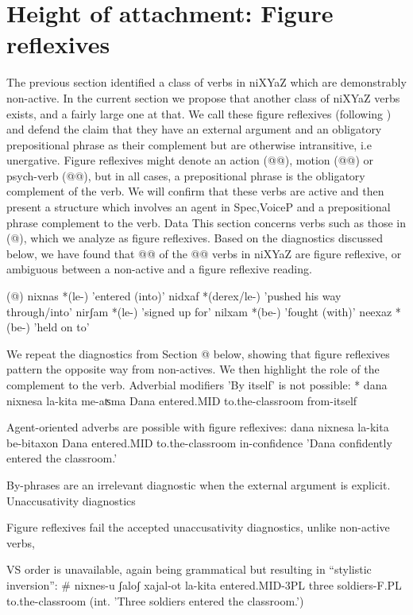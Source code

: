 \section{Height of attachment: Figure reflexives}
The previous section identified a class of verbs in niXYaZ which are demonstrably non-active. In the current section we propose that another class of niXYaZ verbs exists, and a fairly large one at that. We call these figure reflexives (following \cite{woord14nllt}) and defend the claim that they have an external argument and an obligatory prepositional phrase as their complement but are otherwise intransitive, i.e unergative. Figure reflexives might denote an action (@@), motion (@@) or psych-verb (@@), but in all cases, a prepositional phrase is the obligatory complement of the verb. We will confirm that these verbs are active and then present a structure which involves an agent in Spec,VoiceP and a prepositional phrase complement to the verb.
Data
This section concerns verbs such as those in (@), which we analyze as figure reflexives. Based on the diagnostics discussed below, we have found that @@ of the @@ verbs in niXYaZ are figure reflexive, or ambiguous between a non-active and a figure reflexive reading.
   
(@)     nixnas  *(le-)  'entered (into)' 
        nidxaf  *(derex/le-)  'pushed his way through/into' 
        nirʃam  *(le-)  'signed up for' 
        nilxam  *(be-)  'fought (with)' 
        neexaz  *(be-)  'held on to' 
    
We repeat the diagnostics from Section @ below, showing that figure reflexives pattern the opposite way from non-actives. We then highlight the role of the complement to the verb.
Adverbial modifiers
'By itself' is not possible:
     * dana nixnesa la-kita me-aʦma
         Dana entered.MID to.the-classroom from-itself

Agent-oriented adverbs are possible with figure reflexives:
         dana nixnesa la-kita be-bitaxon
         Dana entered.MID to.the-classroom in-confidence
         'Dana confidently entered the classroom.'

By-phrases are an irrelevant diagnostic when the external argument is explicit.
Unaccusativity diagnostics

Figure reflexives fail the accepted unaccusativity diagnostics, unlike non-active verbs,

VS order is unavailable, again being grammatical but resulting in “stylistic inversion”:
 \# nixnes-u ʃaloʃ xajal-ot la-kita
         entered.MID-3PL three soldiers-F.PL to.the-classroom
         (int. 'Three soldiers entered the classroom.')

